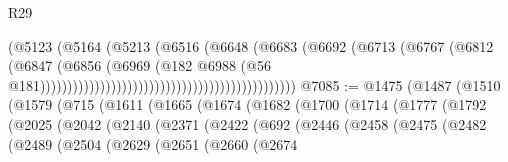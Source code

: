 \begin{lexlean}{R29}
\begin{coremodule}
                                                                    (@5123
                                                                      (@5164
                                                                        (@5213
                                                                          (@6516
                                                                            (@6648
                                                                              (@6683
                                                                                (@6692
                                                                                  (@6713
                                                                                    (@6767
                                                                                      (@6812
                                                                                        (@6847
                                                                                          (@6856
                                                                                            (@6969
                                                                                              (@182
                                                                                                @6988
                                                                                                (@56
                                                                                                  @181)))))))))))))))))))))))))))))))))))))))))))))))
@7085 := @1475
    (@1487
      (@1510
        (@1579
          (@715
            (@1611
              (@1665
                (@1674
                  (@1682
                    (@1700
                      (@1714
                        (@1777
                          (@1792
                            (@2025
                              (@2042
                                (@2140
                                  (@2371
                                    (@2422
                                      (@692
                                        (@2446
                                          (@2458
                                            (@2475
                                              (@2482
                                                (@2489
                                                  (@2504
                                                    (@2629
                                                      (@2651
                                                        (@2660
                                                          (@2674

\end{coremodule}
\end{lexlean}
